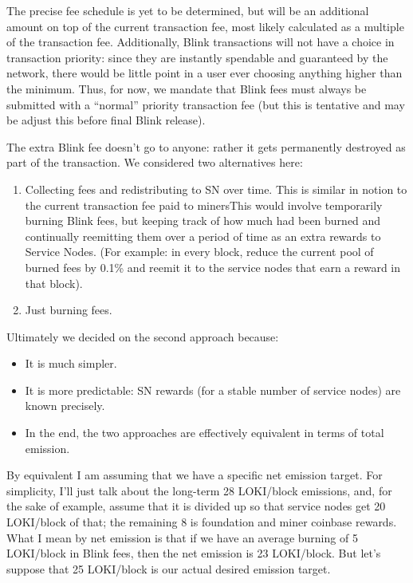 The precise fee schedule is yet to be determined, but will be an
additional amount on top of the current transaction fee, most likely
calculated as a multiple of the transaction fee. Additionally, Blink
transactions will not have a choice in transaction priority: since they
are instantly spendable and guaranteed by the network, there would be
little point in a user ever choosing anything higher than the minimum.
Thus, for now, we mandate that Blink fees must always be submitted with
a ``normal'' priority transaction fee (but this is tentative and may be
adjust this before final Blink release).

The extra Blink fee doesn't go to anyone: rather it gets permanently
destroyed as part of the transaction. We considered two alternatives
here:

\begin{enumerate}
\def\labelenumi{\arabic{enumi}.}
\tightlist
\item
  Collecting fees and redistributing to SN over time. This is similar in
  notion to the current transaction fee paid to minersThis would involve
  temporarily burning Blink fees, but keeping track of how much had been
  burned and continually reemitting them over a period of time as an
  extra rewards to Service Nodes. (For example: in every block, reduce
  the current pool of burned fees by 0.1\% and reemit it to the service
  nodes that earn a reward in that block).
\item
  Just burning fees.
\end{enumerate}

Ultimately we decided on the second approach because:

\begin{itemize}
\tightlist
\item
  It is much simpler.
\item
  It is more predictable: SN rewards (for a stable number of service
  nodes) are known precisely.
\item
  In the end, the two approaches are effectively equivalent in terms of
  total emission.
\end{itemize}

By equivalent I am assuming that we have a specific net emission target.
For simplicity, I'll just talk about the long-term 28 LOKI/block
emissions, and, for the sake of example, assume that it is divided up so
that service nodes get 20 LOKI/block of that; the remaining 8 is
foundation and miner coinbase rewards. What I mean by net emission is
that if we have an average burning of 5 LOKI/block in Blink fees, then
the net emission is 23 LOKI/block. But let's suppose that 25 LOKI/block
is our actual desired emission target.

